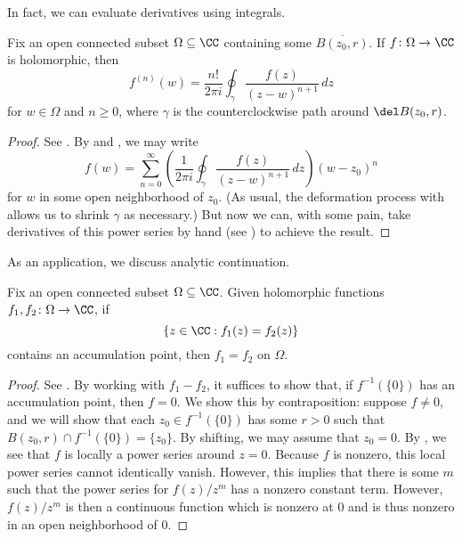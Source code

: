 \documentclass[notes.tex]{subfiles}
\begin{document}
In fact, we can evaluate derivatives using integrals.
\begin{corollary} \label{cor:compute-deriv-via-int}
	Fix an open connected subset $\Omega\subseteq\CC$ containing some $\overline{B(z_0,r)}$. If $f\colon\Omega\to\CC$ is holomorphic, then
	\[f^{(n)}(w)=\frac{n!}{2\pi i}\oint_\gamma\frac{f(z)}{(z-w)^{n+1}}\,dz\]
	for $w\in\Omega$ and $n\ge0$, where $\gamma$ is the counterclockwise path around $\del B(z_0,r)$.
\end{corollary}
\begin{proof}
	See \cite[Corollary~4.71]{nir-complex-analysis}. By  and , we may write
	\[f(w)=\sum_{n=0}^\infty\left(\frac1{2\pi i}\oint_\gamma\frac{f(z)}{(z-w)^{n+1}}\,dz\right)(w-z_0)^n\]
	for $w$ in some open neighborhood of $z_0$. (As usual, the deformation process with  allows us to shrink $\gamma$ as necessary.) But now we can, with some pain, take derivatives of this power series by hand (see \cite[Proposition~3.44]{nir-complex-analysis}) to achieve the result.
\end{proof}
As an application, we discuss analytic continuation.
\begin{theorem}
	Fix an open connected subset $\Omega\subseteq\CC$. Given holomorphic functions $f_1,f_2\colon\Omega\to\CC$, if
	\[\{z\in\CC:f_1(z)=f_2(z)\}\]
	contains an accumulation point, then $f_1=f_2$ on $\Omega$.
\end{theorem}
\begin{proof}
	See \cite[Theorem~5.1]{nir-complex-analysis}. By working with $f_1-f_2$, it suffices to show that, if $f^{-1}(\{0\})$ has an accumulation point, then $f=0$. We show this by contraposition: suppose $f\ne0$, and we will show that each $z_0\in f^{-1}(\{0\})$ has some $r>0$ such that $B(z_0,r)\cap f^{-1}(\{0\})=\{z_0\}$. By shifting, we may assume that $z_0=0$. By , we see that $f$ is locally a power series around $z=0$. Because $f$ is nonzero, this local power series cannot identically vanish. However, this implies that there is some $m$ such that the power series for $f(z)/z^m$ has a nonzero constant term. However, $f(z)/z^m$ is then a continuous function which is nonzero at $0$ and is thus nonzero in an open neighborhood of $0$.
\end{proof}
\end{document}
